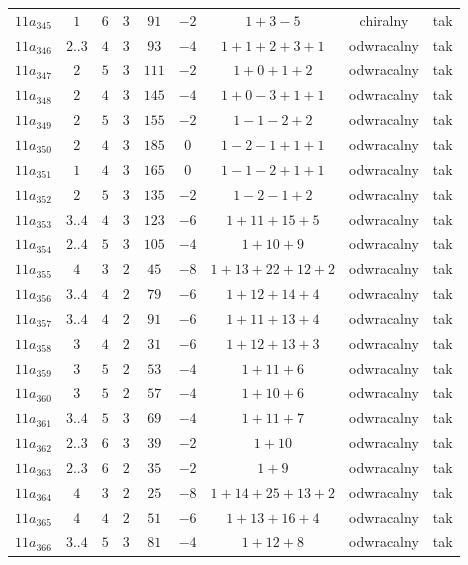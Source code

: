 \begin{longtable}{ccccccccc}
$11a_{345}$ & $1$ & $6$ & $3$ & $91$ & $-2$ & $1+3-5$ & chiralny & tak \\
$11a_{346}$ & $2..3$ & $4$ & $3$ & $93$ & $-4$ & $1+1+2+3+1$ & odwracalny & tak \\
$11a_{347}$ & $2$ & $5$ & $3$ & $111$ & $-2$ & $1+0+1+2$ & odwracalny & tak \\
$11a_{348}$ & $2$ & $4$ & $3$ & $145$ & $-4$ & $1+0-3+1+1$ & odwracalny & tak \\
$11a_{349}$ & $2$ & $5$ & $3$ & $155$ & $-2$ & $1-1-2+2$ & odwracalny & tak \\
$11a_{350}$ & $2$ & $4$ & $3$ & $185$ & $0$ & $1-2-1+1+1$ & odwracalny & tak \\
$11a_{351}$ & $1$ & $4$ & $3$ & $165$ & $0$ & $1-1-2+1+1$ & odwracalny & tak \\
$11a_{352}$ & $2$ & $5$ & $3$ & $135$ & $-2$ & $1-2-1+2$ & odwracalny & tak \\
$11a_{353}$ & $3..4$ & $4$ & $3$ & $123$ & $-6$ & $1+11+15+5$ & odwracalny & tak \\
$11a_{354}$ & $2..4$ & $5$ & $3$ & $105$ & $-4$ & $1+10+9$ & odwracalny & tak \\
$11a_{355}$ & $4$ & $3$ & $2$ & $45$ & $-8$ & $1+13+22+12+2$ & odwracalny & tak \\
$11a_{356}$ & $3..4$ & $4$ & $2$ & $79$ & $-6$ & $1+12+14+4$ & odwracalny & tak \\
$11a_{357}$ & $3..4$ & $4$ & $2$ & $91$ & $-6$ & $1+11+13+4$ & odwracalny & tak \\
$11a_{358}$ & $3$ & $4$ & $2$ & $31$ & $-6$ & $1+12+13+3$ & odwracalny & tak \\
$11a_{359}$ & $3$ & $5$ & $2$ & $53$ & $-4$ & $1+11+6$ & odwracalny & tak \\
$11a_{360}$ & $3$ & $5$ & $2$ & $57$ & $-4$ & $1+10+6$ & odwracalny & tak \\
$11a_{361}$ & $3..4$ & $5$ & $3$ & $69$ & $-4$ & $1+11+7$ & odwracalny & tak \\
$11a_{362}$ & $2..3$ & $6$ & $3$ & $39$ & $-2$ & $1+10$ & odwracalny & tak \\
$11a_{363}$ & $2..3$ & $6$ & $2$ & $35$ & $-2$ & $1+9$ & odwracalny & tak \\
$11a_{364}$ & $4$ & $3$ & $2$ & $25$ & $-8$ & $1+14+25+13+2$ & odwracalny & tak \\
$11a_{365}$ & $4$ & $4$ & $2$ & $51$ & $-6$ & $1+13+16+4$ & odwracalny & tak \\
$11a_{366}$ & $3..4$ & $5$ & $3$ & $81$ & $-4$ & $1+12+8$ & odwracalny & tak \\

\end{longtable}
